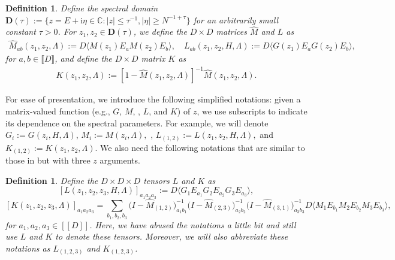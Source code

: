 \documentclass[10pt,reqno]{amsart}
\numberwithin{equation}{section}
\numberwithin{figure}{section}
\theoremstyle{plain} %
\newtheorem{definition}[theorem]{Definition}
\theoremstyle{definition} %
\newcommand{\wh}{\widehat}
\newcommand{\C}{\mathbb{C}}
\newcommand{\ii}{\mathrm{i}}
\newcommand{\qq}[1]{[\![{#1}]\!]}
\DeclareMathOperator{\tr}{\mathrm{Tr}}
\numberwithin{equation}{section}
\begin{document}
\begin{definition}
    \label{def_wtM} 
Define the spectral domain $\mathbf D(\tau):=\{z=E+\ii \eta\in \C :|z|\le \tau^{-1}, |\eta| \ge N^{-1+\tau}\}$ for an arbitrarily small constant $\tau>0$.
For $z_1,z_2\in \mathbf D(\tau)$, we define the $D\times D$ matrices $\wh M$ and $L$ as
\begin{align}\label{def_ML}
    \wh M_{ab}(z_1,z_2,\Lambda):=D\langle M(z_1) E_{a} M(z_2) E_{b}\rangle ,\quad L_{ab}(z_1,z_2, H, \Lambda):= D\langle G(z_1)E_{a}G(z_2)E_{b}\rangle , %
\end{align}
for  $a,b\in \llbracket D\rrbracket$, and define the $D\times D$ matrix $K$ as
\begin{align}\label{def_K}   K(z_1,z_2, \Lambda ):= \left[1-\wh M(z_1,z_2,\Lambda)\right]^{-1} \wh M(z_1,z_2,\Lambda).
\end{align}
\end{definition}

For ease of presentation, we introduce the following simplified notations: given a matrix-valued function (e.g., $G$, $M$, \smash{$\wh M$}, $L$, and $K$) of $z$, we use subscripts to indicate its dependence on the spectral parameters. For example, we will denote $G_i:= G(z_i,H,\Lambda)$, $M_{i}:=M(z_{i},\Lambda),$ \smash{$\wh M_{(1,2 )}:=\wh M(z_{1 },z_{2 } ,\Lambda )$}, $L_{(1,2)}:=L(z_{1 },z_{2 }, H ,\Lambda ),$ and $K_{(1,2 )}:=K(z_{1 },z_{2 } ,\Lambda )$. We also need the following notations that are similar to those in  but with three $z$ arguments.

\begin{definition}\label{defLK3}
Define the $D\times D\times D$ tensors $L$ and $K$ as
$$
\left[L(z_1, z_2, z_3, H, \Lambda)\right]_{a_1 a_2 a_3}:= D\langle G_1E_{a_1}G_2E_{a_2}G_3E_{a_3}\rangle,
$$
$$\left[K(z_1, z_2, z_3, \Lambda)\right]_{a_1 a_2 a_3} = \sum_{b_1, b_2, b_3}\big(I - \wh M_{(1,2)}\big)^{-1}_{a_1b_1}\big(I - \wh M_{(2,3)}\big)^{-1}_{a_2b_2}\big(I - \wh M_{(3,1)}\big)^{-1}_{a_3b_3}D\langle M_1E_{b_1}M_2E_{b_2}M_3E_{b_3}\rangle ,
$$
for $a_1,a_2,a_3\in \qq D$. Here, we have abused the notations a little bit and still use $L$ and $K$ to denote these tensors. Moreover, we will also abbreviate these notations as $L_{(1,2,3)}$ and $K_{(1,2,3)}$.
\end{definition} 
\end{document}
